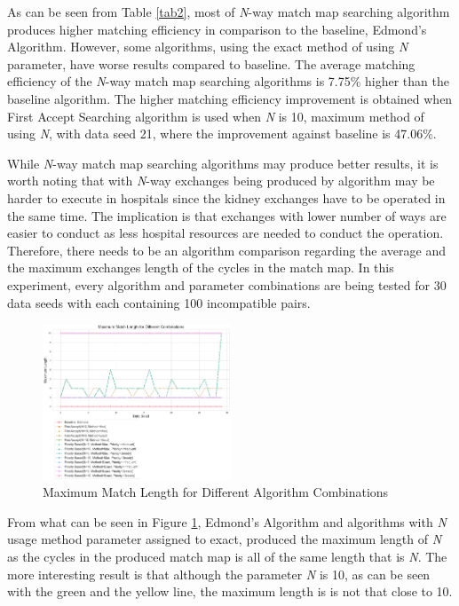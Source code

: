 \documentclass[conference]{IEEEtran}
\begin{document}
As can be seen from Table \ref{tab2}, most of \textit{N}-way match map searching algorithm produces higher matching efficiency in
comparison to the baseline, Edmond's Algorithm. However, some algorithms, using the exact method of using \textit{N} parameter,
have worse results compared to baseline. The average matching efficiency of the \textit{N}-way match map searching
algorithms is 7.75\% higher than the baseline algorithm. The higher matching efficiency improvement is obtained when First Accept
Searching algorithm is used when \textit{N} is 10, maximum method of using \textit{N}, with data seed 21, where the improvement
against baseline is 47.06\%.

While \textit{N}-way match map searching algorithms may produce better results, it is worth noting that with \textit{N}-way exchanges
being produced by algorithm may be harder to execute in hospitals since the kidney exchanges have to be operated in the same time. The
implication is that exchanges with lower number of ways are easier to conduct as less hospital resources are needed to conduct the operation.
Therefore, there needs to be an algorithm comparison regarding the average and the maximum exchanges length of the cycles in the match map.
In this experiment, every algorithm and parameter combinations are being tested for 30 data seeds with each containing 100 incompatible pairs. 

\begin{figure}[h]
   \includegraphics[width=0.5\textwidth]{images/maximum_match_length_for_different_combinations.png}
   \caption{Maximum Match Length for Different Algorithm Combinations}
   \label{figuremaxlength}
\end{figure}

From what can be seen in Figure \ref{figuremaxlength}, Edmond's Algorithm and algorithms with \textit{N} usage method parameter assigned to exact, produced the maximum
length of \textit{N} as the cycles in the produced match map is all of the same length that is \textit{N}.
The more interesting result is that although the parameter \textit{N} is 10, as can be seen with the green and the yellow line, the maximum length is
is not that close to 10. 
\end{document}
